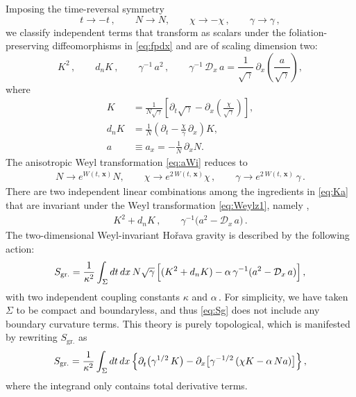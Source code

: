 \documentclass[11pt]{article}
\newcommand{\be}{\begin{equation}}
\newcommand{\ee}{\end{equation}}
\newcommand{\CD}{\mathcal{D}}
\newcommand{\lr}{\left (}
\newcommand{\rr}{\right )}
\newcommand{\ls}{\left [}
\newcommand{\rs}{\right ]}
\newcommand{\p}{\partial}
\begin{document}
Imposing the time-reversal symmetry
%
\be \label{eq:trsx}
	t \rightarrow - t\,,
		\qquad
	N \rightarrow N,
		\qquad
	\chi \rightarrow - \chi\,,
		\qquad
	\gamma \rightarrow \gamma\,,
\ee
% 
we classify independent terms that transform as scalars under the foliation-preserving diffeomorphisms in \eqref{eq:fpdx} and are of scaling dimension two:
%
\be \label{eq:Ka}
	K^2\,, 
		\qquad
	d_n K\,,
		\qquad
	\gamma^{-1} \, a^2\,,
		\qquad
	\gamma^{-1} \, \CD_x \, a = \frac{1}{\sqrt{\gamma}} \, \p_x \! \lr \frac{a}{\sqrt{\gamma}} \rr,
\ee
%
where
%
\begin{subequations}
\begin{align}
	K & = \frac{1}{N \sqrt{\gamma}} \ls \p_t \sqrt{\gamma} - \p_{x} \! \lr \frac{\chi}{\sqrt{\gamma}} \rr \rs \!, \\[2pt]
	d_n K & = \frac{1}{N} \lr \! \p_t - \frac{\chi}{\gamma} \, \p_x \! \rr \! K, \\[2pt]
	a & \equiv a_x = - \frac{1}{N} \, \p_x N.
\end{align}
\end{subequations}
%
The anisotropic Weyl transformation \eqref{eq:aWi} reduces to
%
\begin{align} \label{eq:Weylz1}
	N \rightarrow e^{W(t,\, \mathbf{x})} N,
		\qquad
	\chi \rightarrow e^{2 \, W(t,\, \mathbf{x})} \chi\,,
		\qquad
	\gamma \rightarrow e^{2 \, W(t,\, \mathbf{x})} \, \gamma\,.
\end{align}
%
There are two independent linear combinations among the ingredients in \eqref{eq:Ka} that are invariant under the Weyl transformation \eqref{eq:Weylz1}, namely \cite{Arav:2014goa},
%
\begin{align}
	K^2 + d_n K\,,
		\qquad
	\gamma^{-1} \bigl( a^2 - \CD_{x} \, a \bigr)\,.
\end{align}
%
The two-dimensional Weyl-invariant Ho\v{r}ava gravity is described by the following action:
%
\be \label{eq:Sg}
	S_\text{gr.} = \frac{1}{\kappa^2} \int_\Sigma dt \, dx \, N \sqrt{\gamma} \, \Bigl[ (K^2 + d_n K) - \alpha \, \gamma^{-1} (a^2 - \CD_{x} \, a) \Bigr]\,,
\ee
%
with two independent coupling constants $\kappa$ and $\alpha$\,. For simplicity, we have taken $\Sigma$ to be compact and boundaryless, and thus \eqref{eq:Sg} does not include any boundary curvature terms. This theory is purely topological, which is manifested by rewriting $S_\text{gr.}$ as
%
\be
	S_\text{gr.} = \frac{1}{\kappa^2} \int_\Sigma dt \, dx \, \Bigl\{ \p^{}_t \bigl( \gamma^{1/2} \, K \bigr) - \p_x \bigl[ \gamma^{-1/2} \lr \chi K - \alpha \, N a \rr \bigr] \Bigr\}\,,
\ee
%
where the integrand only contains total derivative terms. 
\end{document}

